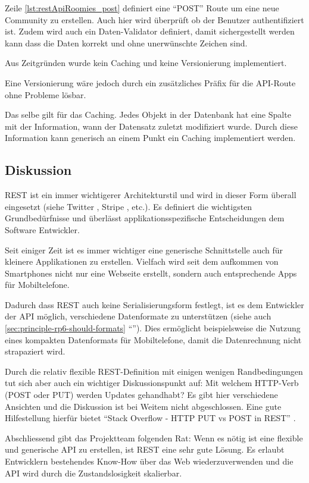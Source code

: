 Zeile \autoref{lst:restApiRoomies_post} definiert eine ``POST'' Route um eine neue Community zu erstellen. Auch hier wird überprüft ob der Benutzer authentifiziert ist. Zudem wird auch ein Daten-Validator definiert, damit sichergestellt werden kann dass die Daten korrekt und ohne unerwünschte Zeichen sind.


Aus Zeitgründen wurde kein Caching und keine Versionierung implementiert.

Eine Versionierung wäre jedoch durch ein zusätzliches Präfix für die API-Route ohne Probleme lösbar.

Das selbe gilt für das Caching. Jedes Objekt in der Datenbank hat eine Spalte mit der Information, wann der Datensatz zuletzt modifiziert wurde. Durch diese Information kann generisch an einem Punkt ein Caching implementiert werden.

\subsection*{Diskussion}

REST ist ein immer wichtigerer Architekturstil und wird in dieser Form überall eingesetzt (siehe Twitter \cite{TwitterAPI}, Stripe \cite{StripeAPI}, etc.). Es definiert die wichtigsten Grundbedürfnisse und überlässt applikationsspezifische Entscheidungen dem Software Entwickler.

Seit einiger Zeit ist es immer wichtiger eine generische Schnittstelle auch für kleinere Applikationen zu erstellen. Vielfach wird seit dem aufkommen von Smartphones nicht nur eine Webseite erstellt, sondern auch entsprechende Apps für Mobiltelefone.

Dadurch dass REST auch keine Serialisierungsform festlegt, ist es dem Entwickler der API möglich, verschiedene Datenformate zu unterstützen (siehe auch \ref{sec:principle-rp6-should-formats} ``''). Dies ermöglicht beispielsweise die Nutzung eines kompakten Datenformats für Mobiltelefone, damit die Datenrechnung nicht strapaziert wird.

Durch die relativ flexible REST-Definition mit einigen wenigen Randbedingungen tut sich aber auch ein wichtiger Diskussionspunkt auf: Mit welchem HTTP-Verb (POST oder PUT) werden Updates gehandhabt? Es gibt hier verschiedene Ansichten und die Diskussion ist bei Weitem nicht abgeschlossen. Eine gute Hilfestellung hierfür bietet ``Stack Overflow - HTTP PUT vs POST in REST'' \cite{StackoverflowPUTvsPOST}.

Abschliessend gibt das Projektteam folgenden Rat: Wenn es nötig ist eine flexible und generische API zu erstellen, ist REST eine sehr gute Lösung. Es erlaubt Entwicklern bestehendes Know-How über das Web wiederzuverwenden und die API wird durch die Zustandslosigkeit skalierbar.
